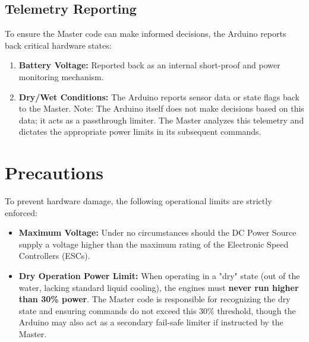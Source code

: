 \documentclass[12pt,a4paper]{article}
\begin{document}
\subsection{Telemetry Reporting}
To ensure the Master code can make informed decisions, the Arduino reports back critical hardware states:
\begin{enumerate}
    \item \textbf{Battery Voltage:} Reported back as an internal short-proof and power monitoring mechanism.
    \item \textbf{Dry/Wet Conditions:} The Arduino reports sensor data or state flags back to the Master. Note: The Arduino itself does not make decisions based on this data; it acts as a passthrough limiter. The Master analyzes this telemetry and dictates the appropriate power limits in its subsequent commands.
\end{enumerate}

\section{Precautions}
To prevent hardware damage, the following operational limits are strictly enforced:

\begin{itemize}
    \item \textbf{Maximum Voltage:} Under no circumstances should the DC Power Source supply a voltage higher than the maximum rating of the Electronic Speed Controllers (ESCs).
    \item \textbf{Dry Operation Power Limit:} When operating in a "dry" state (out of the water, lacking standard liquid cooling), the engines must \textbf{never run higher than 30\% power}. The Master code is responsible for recognizing the dry state and ensuring commands do not exceed this 30\% threshold, though the Arduino may also act as a secondary fail-safe limiter if instructed by the Master.
\end{itemize}
\end{document}
